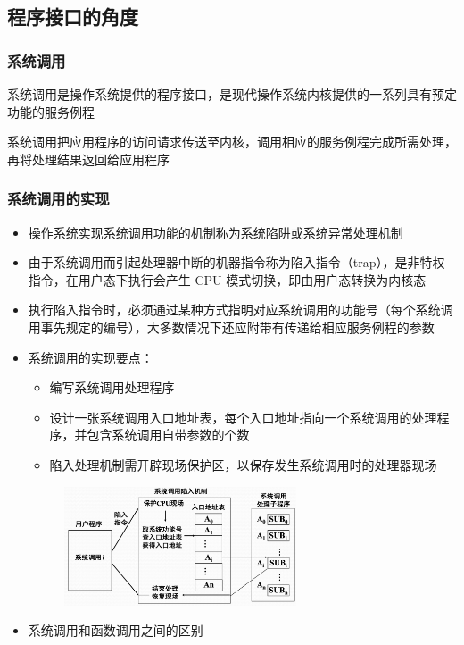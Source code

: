 \documentclass[cs4size,a4paper,10pt]{ctexart}
\begin{document}
		\subsection{程序接口的角度}
		\subsubsection{系统调用}
		系统调用是操作系统提供的程序接口，是现代操作系统内核提供的一系列具有预定功能的服务例程

		系统调用把应用程序的访问请求传送至内核，调用相应的服务例程完成所需处理，再将处理结果返回给应用程序

		\subsubsection{系统调用的实现}
		\begin{itemize}
			\item 操作系统实现系统调用功能的机制称为系统陷阱或系统异常处理机制
			\item 由于系统调用而引起处理器中断的机器指令称为陷入指令（trap），是非特权指令，在用户态下执行会产生 CPU 模式切换，即由用户态转换为内核态
			\item 执行陷入指令时，必须通过某种方式指明对应系统调用的功能号（每个系统调用事先规定的编号），大多数情况下还应附带有传递给相应服务例程的参数
			\item 系统调用的实现要点：
			\begin{itemize}
				\item 编写系统调用处理程序
				\item 设计一张系统调用入口地址表，每个入口地址指向一个系统调用的处理程序，并包含系统调用自带参数的个数
				\item 陷入处理机制需开辟现场保护区，以保存发生系统调用时的处理器现场
			\end{itemize}
			\begin{figure}[H]
				\centering
				\includegraphics[width=0.65\textwidth]{img/1.3.5.2}
			\end{figure}
			\item 系统调用和函数调用之间的区别

\end{itemize}
\end{document}
